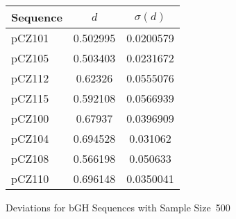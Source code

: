 \begin{cfigure}
\begin{singlespace}
    \begin{tabular}{lcc}
        \toprule
        \textbf{Sequence} & $d$ & $\sigma(d)$\\
        \midrule
        pCZ101 & 0.502995 & 0.0200579\\
        pCZ105 & 0.503403 & 0.0231672\\
        pCZ112 & 0.62326 & 0.0555076\\
        pCZ115 & 0.592108 & 0.0566939\\
        \midrule
        pCZ100 & 0.67937 & 0.0396909\\
        pCZ104 & 0.694528 & 0.031062\\
        pCZ108 & 0.566198 & 0.050633\\
        pCZ110 & 0.696148 & 0.0350041\\
        \bottomrule
    \end{tabular}
    \caption{Deviations for bGH Sequences with Sample Size~500}
    \label{bgh:deviation}
\end{singlespace}
\end{cfigure}
